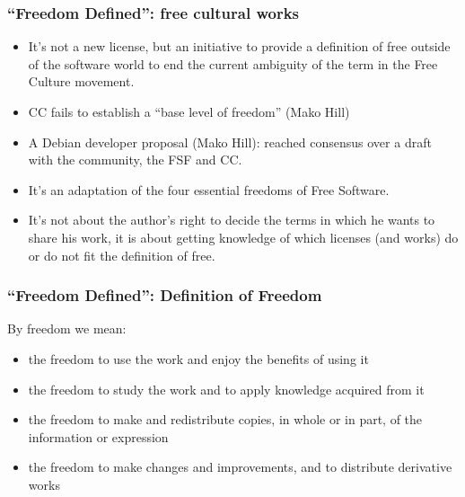 \begin{frame}
\frametitle{``Freedom Defined'': free cultural works}

\begin{itemize}
\item It's not a new license, but an initiative to provide a definition of \alert{free} outside of the software world to end the current ambiguity of the term in the Free Culture movement.
\item CC fails to establish a ``base level of freedom'' (Mako Hill)
\item A Debian developer proposal (Mako Hill): reached consensus over a draft with the community, the FSF and CC. 
\item It's an adaptation of the four essential freedoms of Free Software.
\item It's not about the author's right to decide the terms in which he wants to share his work, it is about getting knowledge of which licenses (and works) do or do not fit the definition of \alert{free}.
\end{itemize}                                                 

\end{frame}



\begin{frame}
\frametitle{``Freedom Defined'': Definition of Freedom}

By \alert{freedom} we mean:

\begin{itemize}
\item the \alert{freedom to use} the work and enjoy the benefits of using it
\item the \alert{freedom to study} the work and to apply knowledge acquired from it
\item the \alert{freedom to make and redistribute copies}, in whole or in part, of the information or expression
\item the \alert{freedom to make changes and improvements}, and to distribute derivative works 
\end{itemize}                                                 

\end{frame}


